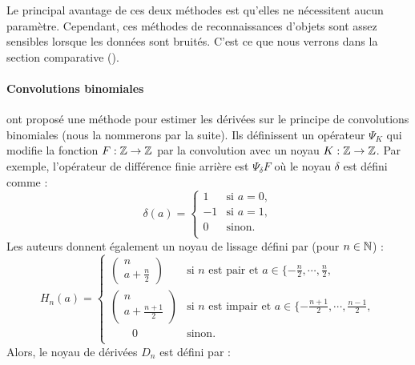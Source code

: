 Le principal avantage de ces deux méthodes est qu'elles ne nécessitent aucun
paramètre. Cependant, ces méthodes de reconnaissances d'objets sont assez
sensibles lorsque les données sont bruités. C'est ce que nous verrons dans la
section comparative ().
%
\paragraph{Convolutions binomiales}
%
 ont proposé une méthode pour estimer les
dérivées sur le principe de convolutions binomiales (nous la nommerons \BC par
la suite). Ils définissent un opérateur $\Psi_K$ qui modifie la fonction $F : \mathbb{Z}
\rightarrow \mathbb{Z}$ par la convolution avec un noyau $K : \mathbb{Z} \rightarrow \mathbb{Z}$. Par
exemple, l'opérateur de différence finie arrière est $\Psi_\delta F$ où le noyau
$\delta$ est défini comme :
%
\begin{equation}
    \delta(a) =
      \begin{cases}
        1   & \text{si } a = 0,\\
        -1  & \text{si } a = 1,\\
        0   & \text{sinon}.\\
      \end{cases}
\end{equation}
%
Les auteurs donnent également un noyau de lissage défini par (pour $n \in \mathbb{N}$) :
%
\begin{equation}
  H_n(a) =
    \begin{cases}
      \left(\!
        \begin{array}{c}
          n \\
          a + \frac{n}{2}
        \end{array}
        \!\right)   & \text{si } n \text{ est pair et } a \in \{ -\frac{n}{2}, \cdots, \frac{n}{2},\\
        \left(\!
          \begin{array}{c}
            n \\
            a + \frac{n + 1}{2}
          \end{array}
          \!\right)   & \text{si } n \text{ est impair et } a \in \{ -\frac{n + 1}{2}, \cdots, \frac{n - 1}{2},\\
      \quad\quad 0   & \text{sinon}.\\
    \end{cases}
\end{equation}
%
Alors, le noyau de dérivées $D_n$ est défini par :
